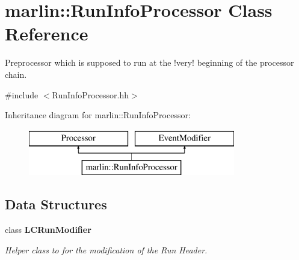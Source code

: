 \section{marlin\-:\-:Run\-Info\-Processor Class Reference}
\label{classmarlin_1_1RunInfoProcessor}


Preprocessor which is supposed to run at the !very! beginning of the processor chain.  




{\ttfamily \#include $<$Run\-Info\-Processor.\-hh$>$}

Inheritance diagram for marlin\-:\-:Run\-Info\-Processor\-:\begin{figure}[H]
\begin{center}
\leavevmode
\includegraphics[height=2.000000cm]{classmarlin_1_1RunInfoProcessor}
\end{center}
\end{figure}
\subsection*{Data Structures}
\begin{DoxyCompactItemize}
\item 
class {\bf L\-C\-Run\-Modifier}
\begin{DoxyCompactList}\small\item\em Helper class to for the modification of the Run Header. \end{DoxyCompactList}\end{DoxyCompactItemize}
